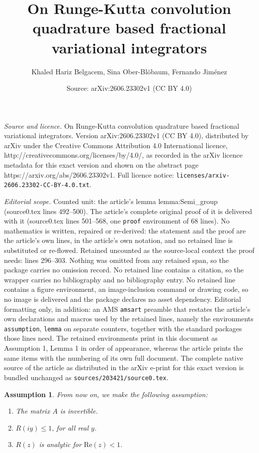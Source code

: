 \documentclass[10pt,a4paper]{amsart}
\title{On Runge-Kutta convolution quadrature based fractional variational integrators}
\author{Khaled Hariz Belgacem, Sina Ober-Bl\"obaum, Fernando Jim\'enez}
\date{Source: arXiv:2606.23302v1 (CC BY 4.0)}
\newtheorem{assumption}{Assumption}
\begin{document}
\maketitle

\noindent\emph{Source and licence.} On Runge-Kutta convolution quadrature based fractional variational integrators. Version arXiv:2606.23302v1 (CC BY 4.0), distributed by arXiv under the Creative Commons Attribution 4.0 International licence, http://creativecommons.org/licenses/by/4.0/, as recorded in the arXiv licence metadata for this exact version and shown on the abstract page https://arxiv.org/abs/2606.23302v1. Full licence notice: \texttt{licenses/arxiv-2606.23302-CC-BY-4.0.txt}.\par\smallskip

\noindent\textit{Editorial scope.} Counted unit: the article's lemma lemma:Semi\_group (source0.tex lines 492--500). The article's complete original proof of it is delivered with it (source0.tex lines 501--568, one \texttt{proof} environment of 68 lines). No mathematics is written, repaired or re-derived: the statement and the proof are the article's own lines, in the article's own notation, and no retained line is substituted or re-flowed.  Retained uncounted as the source-local context the proof needs: lines 296--303.  Nothing was omitted from any retained span, so the package carries no omission record.  No retained line contains a citation, so the wrapper carries no bibliography and no bibliography entry.  No retained line contains a figure environment, an image-inclusion command or drawing code, so no image is delivered and the package declares no asset dependency.  Editorial formatting only, in addition: an AMS \texttt{amsart} preamble that restates the article's own declarations and macros used by the retained lines, namely the environments \texttt{assumption}, \texttt{lemma} on separate counters, together with the standard packages those lines need.  The retained environments print in this document as Assumption 1, Lemma 1 in order of appearance, whereas the article prints the same items with the numbering of its own full document.  The complete native source of the article as distributed in the arXiv e-print for this exact version is bundled unchanged as \texttt{sources/203421/source0.tex}.
\begin{assumption}\label{assumption}
From now on, we make the following assumption:
\begin{enumerate}[leftmargin=2.5em]
\item The matrix $A$ is invertible.
\item  $R(iy)\leq 1$, for all real $y$.
\item $R(z)$ is analytic for $\mathrm{Re}(z)<1$.
\end{enumerate}
\end{assumption}
\end{document}
